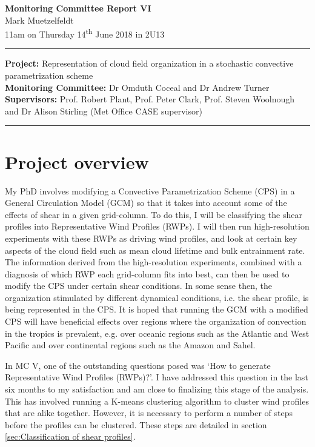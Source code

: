 \documentclass[11pt,a4paper]{article}
\newcommand{\ts}{\textsuperscript}
\begin{document}

\begin{center}
    \Large{\textbf{Monitoring Committee Report VI}}\\[0.1cm]
    \large{Mark Muetzelfeldt}\\
    \normalsize{11am on Thursday 14\ts{th} June 2018 in 2U13}\\[0.1cm]		
    \rule{\textwidth}{0.2mm}
    \textbf{Project: }Representation of cloud field organization in a stochastic convective parametrization scheme\\
    \textbf{Monitoring Committee: }Dr Omduth Coceal and  Dr Andrew Turner\\
    \textbf{Supervisors: }Prof. Robert Plant, Prof. Peter Clark, Prof. Steven Woolnough \\
    and Dr Alison Stirling (Met Office CASE supervisor)\\
    \rule{\textwidth}{0.2mm}
\end{center}

\section{Project overview}
\label{sec:Project Overview}

My PhD involves modifying a Convective Parametrization Scheme (CPS) in a General Circulation Model (GCM) so that it takes into account some of the effects of shear in a given grid-column. To do this, I will be classifying the shear profiles into Representative Wind Profiles (RWPs). I will then run high-resolution experiments with these RWPs as driving wind profiles, and look at certain key aspects of the cloud field such as mean cloud lifetime and bulk entrainment rate. The information derived from the high-resolution experiments, combined with a diagnosis of which RWP each grid-column fits into best, can then be used to modify the CPS under certain shear conditions. In some sense then, the organization stimulated by different dynamical conditions, i.e. the shear profile, is being represented in the CPS. It is hoped that running the GCM with a modified CPS will have beneficial effects over regions where the organization of convection in the tropics is prevalent, e.g. over oceanic regions such as the Atlantic and West Pacific and over continental regions such as the Amazon and Sahel.

In MC V, one of the outstanding questions posed was `How to generate Representative Wind Profiles (RWPs)?'. I have addressed this question in the last six months to my satisfaction and am close to finalizing this stage of the analysis. This has involved running a K-means clustering algorithm to cluster wind profiles that are alike together. However, it is necessary to perform a number of steps before the profiles can be clustered. These steps are detailed in section \ref{sec:Classification of shear profiles}.
\end{document}
